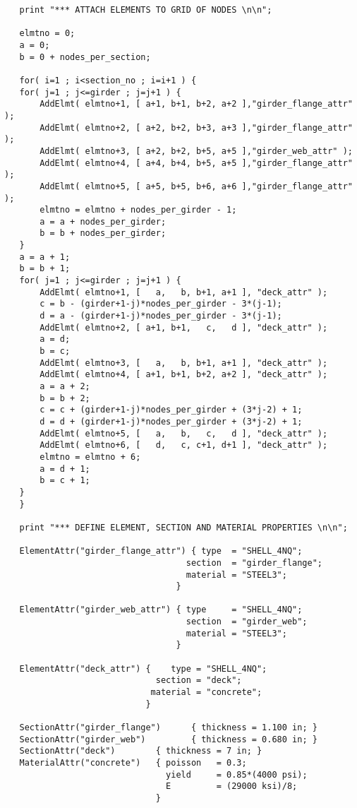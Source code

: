 \begin{footnotesize}
\begin{verbatim}
   print "*** ATTACH ELEMENTS TO GRID OF NODES \n\n";

   elmtno = 0;
   a = 0;
   b = 0 + nodes_per_section;

   for( i=1 ; i<section_no ; i=i+1 ) {
   for( j=1 ; j<=girder ; j=j+1 ) {
       AddElmt( elmtno+1, [ a+1, b+1, b+2, a+2 ],"girder_flange_attr" );
       AddElmt( elmtno+2, [ a+2, b+2, b+3, a+3 ],"girder_flange_attr" );
       AddElmt( elmtno+3, [ a+2, b+2, b+5, a+5 ],"girder_web_attr" );
       AddElmt( elmtno+4, [ a+4, b+4, b+5, a+5 ],"girder_flange_attr" );
       AddElmt( elmtno+5, [ a+5, b+5, b+6, a+6 ],"girder_flange_attr" );
       elmtno = elmtno + nodes_per_girder - 1;
       a = a + nodes_per_girder;
       b = b + nodes_per_girder;
   }
   a = a + 1;
   b = b + 1;
   for( j=1 ; j<=girder ; j=j+1 ) {
       AddElmt( elmtno+1, [   a,   b, b+1, a+1 ], "deck_attr" );
       c = b - (girder+1-j)*nodes_per_girder - 3*(j-1);
       d = a - (girder+1-j)*nodes_per_girder - 3*(j-1);
       AddElmt( elmtno+2, [ a+1, b+1,   c,   d ], "deck_attr" );
       a = d;
       b = c;
       AddElmt( elmtno+3, [   a,   b, b+1, a+1 ], "deck_attr" );
       AddElmt( elmtno+4, [ a+1, b+1, b+2, a+2 ], "deck_attr" );
       a = a + 2;
       b = b + 2;
       c = c + (girder+1-j)*nodes_per_girder + (3*j-2) + 1;
       d = d + (girder+1-j)*nodes_per_girder + (3*j-2) + 1;
       AddElmt( elmtno+5, [   a,   b,   c,   d ], "deck_attr" );
       AddElmt( elmtno+6, [   d,   c, c+1, d+1 ], "deck_attr" );
       elmtno = elmtno + 6;
       a = d + 1;
       b = c + 1;
   }
   }

   print "*** DEFINE ELEMENT, SECTION AND MATERIAL PROPERTIES \n\n";

   ElementAttr("girder_flange_attr") { type  = "SHELL_4NQ";
                                    section  = "girder_flange";
                                    material = "STEEL3";
                                  }

   ElementAttr("girder_web_attr") { type     = "SHELL_4NQ";
                                    section  = "girder_web";
                                    material = "STEEL3";
                                  }

   ElementAttr("deck_attr") {    type = "SHELL_4NQ";
                              section = "deck";
                             material = "concrete";
                            }

   SectionAttr("girder_flange")      { thickness = 1.100 in; }
   SectionAttr("girder_web")         { thickness = 0.680 in; }
   SectionAttr("deck")        { thickness = 7 in; }
   MaterialAttr("concrete")   { poisson   = 0.3;
                                yield     = 0.85*(4000 psi);
                                E         = (29000 ksi)/8;
                              }


\end{verbatim}
\end{footnotesize}

